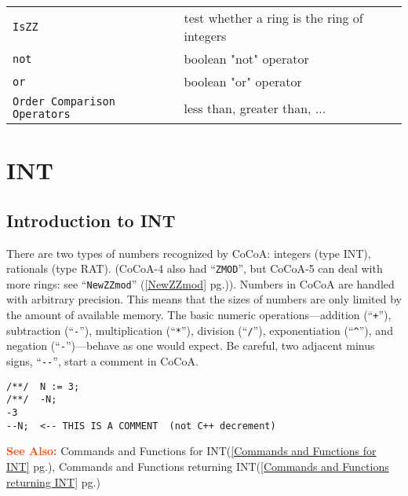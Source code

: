 \documentclass[a4paper]{mybook}
\newcommand\SeeAlso{\par\textcolor{OrangeRed}{\textbf{\large See Also: }}}
\begin{document}
\begin{center}
\begin{longtable}{ll}
{\verb~IsZZ~} &
      test whether a ring is the ring of integers\\
   
{\verb~not~} &
      boolean "not" operator\\
   
{\verb~or~} &
      boolean "or" operator\\
   
{\verb~Order Comparison Operators~} &
      less than, greater than, ...\\
   
\end{longtable}
\end{center}

\noindent



\chapter{INT}
\label{INT}

      

\section{Introduction to INT}
\label{Introduction to INT}

        
There are two types of numbers recognized by CoCoA: integers (type
INT), rationals (type RAT).
(CoCoA-4 also had ``\verb&ZMOD&'', but CoCoA-5 can deal with more rings:
see ``\verb&NewZZmod&'' (\ref{NewZZmod} pg.\pageref{NewZZmod})).
Numbers in CoCoA are handled with arbitrary precision.  This means that the
sizes of numbers are only limited by the amount of available memory.
The basic numeric operations---addition (``\verb&+&''), subtraction (``\verb&-&''),
multiplication (``\verb&*&''), division (``\verb&/&''), exponentiation (``\verb&^&''),
and negation (``\verb&-&'')---behave as one would expect.
Be careful, two adjacent minus signs, ``\verb&--&'', start a comment in CoCoA.
\begin{Verbatim}[label=example, rulecolor=\color{PineGreen}, frame=single]
/**/  N := 3;
/**/  -N;
-3
--N;  <-- THIS IS A COMMENT  (not C++ decrement)
\end{Verbatim}


\SeeAlso %
  Commands and Functions for INT(\ref{Commands and Functions for INT} pg.\pageref{Commands and Functions for INT}), 
    Commands and Functions returning INT(\ref{Commands and Functions returning INT} pg.\pageref{Commands and Functions returning INT})
\end{document}

